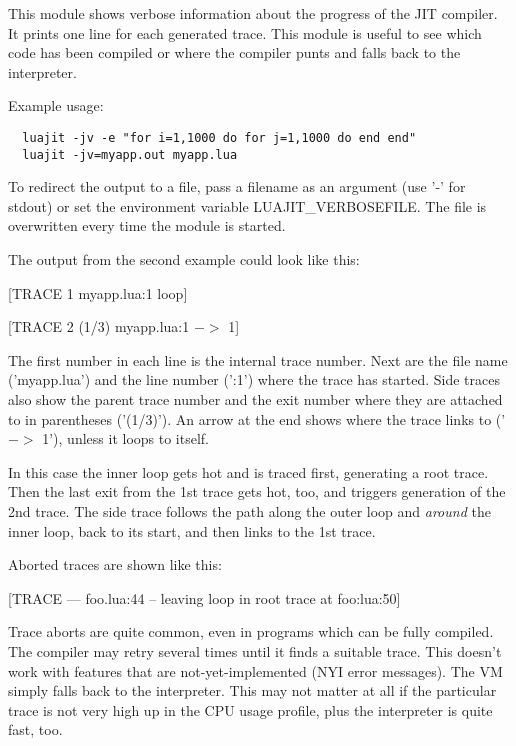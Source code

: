 
This module shows verbose information about the progress of the
JIT compiler. It prints one line for each generated trace. This module
is useful to see which code has been compiled or where the compiler
punts and falls back to the interpreter.

Example usage:

\begin{lstlisting}
  luajit -jv -e "for i=1,1000 do for j=1,1000 do end end"
  luajit -jv=myapp.out myapp.lua
\end{lstlisting}
To redirect the output to a file, pass a
filename as an argument (use '-' for stdout) or set the environment
variable LUAJIT\_VERBOSEFILE. The file is overwritten every time the
module is started.

The output from the second example could look like this:

\begin{center}
[TRACE   1 myapp.lua:1 loop]

[TRACE   2 (1/3) myapp.lua:1 $->$ 1]
\end{center}

The first number in each line is the internal trace number. Next are
the file name ('myapp.lua') and the line number (':1') where the
trace has started. Side traces also show the parent trace number and
the exit number where they are attached to in parentheses ('(1/3)').
An arrow at the end shows where the trace links to ('$->$ 1'), unless
it loops to itself.

In this case the inner loop gets hot and is traced first, generating
a root trace. Then the last exit from the 1st trace gets hot, too,
and triggers generation of the 2nd trace. The side trace follows the
path along the outer loop and \textit{around} the inner loop, back to its
start, and then links to the 1st trace.

Aborted traces are shown like this:
\begin{center}
[TRACE --- foo.lua:44 -- leaving loop in root trace at foo:lua:50]
\end{center}

Trace aborts are quite common, even in programs which
can be fully compiled. The compiler may retry several times until it
finds a suitable trace. This doesn't work with features that are
not-yet-implemented (NYI error messages). The VM simply falls back to the
interpreter. This may not matter at all if the particular trace is not very high
up in the CPU usage profile, plus the interpreter is quite fast, too.